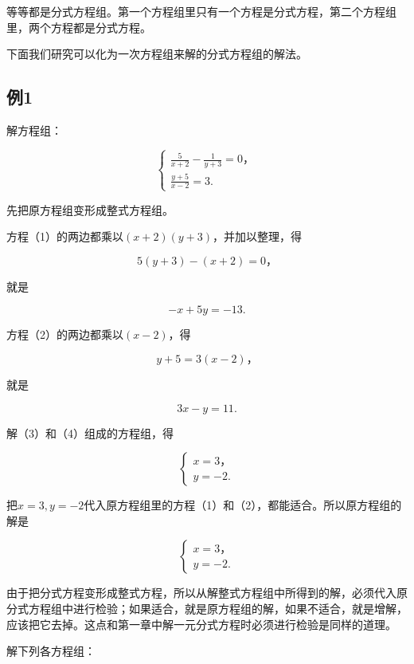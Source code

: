 等等都是分式方程组。第一个方程组里只有一个方程是分式方程，第二个方程组里，两个方程都是分式方程。

下面我们研究可以化为一次方程组来解的分式方程组的解法。

\subsection{例1}

解方程组：

\[
\left\{ \begin{array}{l} \frac{5}{x + 2} - \frac{1}{y + 3} = 0\text{，} \\ \frac{y + 5}{x - 2} = 3. \end{array} \right. \tag{1}
\]

 先把原方程组变形成整式方程组。

方程（1）的两边都乘以\((x+2)(y+3)\)，并加以整理，得

\[
5 (y + 3) - (x + 2) = 0\text{，}
\]

就是

\[
- x + 5 y = - 13. \tag{3}
\]

方程（2）的两边都乘以\((x - 2)\)，得

\[
y + 5 = 3 (x - 2)\text{，}
\]

就是

\[
3 x - y = 11. \tag{4}
\]

解（3）和（4）组成的方程组，得

\[
\left\{ \begin{array}{l} x = 3\text{，} \\ y = - 2. \end{array} \right.
\]

把\(x = 3, y = -2\)代入原方程组里的方程（1）和（2），都能适合。所以原方程组的解是

\[
\left\{ \begin{array}{l} x = 3\text{，} \\ y = - 2. \end{array} \right.
\]

由于把分式方程变形成整式方程，所以从解整式方程组中所得到的解，必须代入原分式方程组中进行检验；如果适合，就是原方程组的解，如果不适合，就是增解，应该把它去掉。这点和第一章中解一元分式方程时必须进行检验是同样的道理。

解下列各方程组：

